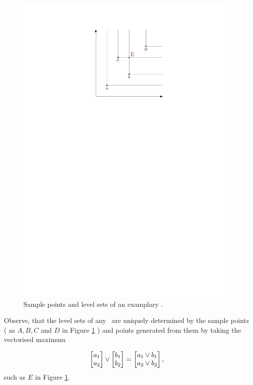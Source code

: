 \begin{figure}
	\centering \includegraphics[scale=1]{./img/KS1.pdf}
	\caption{Sample points and level sets of an examplary \ecdf.}\label{simpleEcdf}
\end{figure}


Observe, that the level sets of any \ecdf\, are uniquely determined by the sample points ( as $A, B, C$ and $D$ in Figure \ref{simpleEcdf} ) and points generated from them by taking the vectorised maximum

$$ 
	\begin{bmatrix} a_1 \cr a_2 \end{bmatrix} \vee 
	\begin{bmatrix} b_1 \cr b_2 \end{bmatrix} = 
	\begin{bmatrix} a_1 \vee b_1 \cr a_2 \vee b_2 \end{bmatrix},
$$ 
such as $E$ in Figure \ref{simpleEcdf}.  

